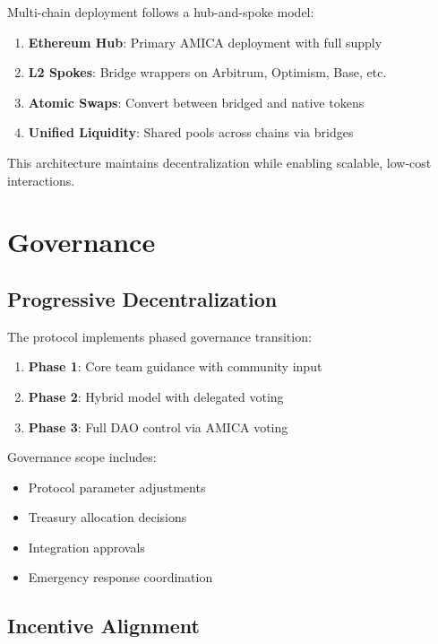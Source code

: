 \documentclass{article}
\begin{document}
Multi-chain deployment follows a hub-and-spoke model:

\begin{enumerate}
    \item \textbf{Ethereum Hub}: Primary AMICA deployment with full supply
    \item \textbf{L2 Spokes}: Bridge wrappers on Arbitrum, Optimism, Base, etc.
    \item \textbf{Atomic Swaps}: Convert between bridged and native tokens
    \item \textbf{Unified Liquidity}: Shared pools across chains via bridges
\end{enumerate}

This architecture maintains decentralization while enabling scalable, low-cost interactions.

\section{Governance}

\subsection{Progressive Decentralization}

The protocol implements phased governance transition:

\begin{enumerate}
    \item \textbf{Phase 1}: Core team guidance with community input
    \item \textbf{Phase 2}: Hybrid model with delegated voting
    \item \textbf{Phase 3}: Full DAO control via AMICA voting
\end{enumerate}

Governance scope includes:
\begin{itemize}
    \item Protocol parameter adjustments
    \item Treasury allocation decisions
    \item Integration approvals
    \item Emergency response coordination
\end{itemize}

\subsection{Incentive Alignment}
\end{document}
